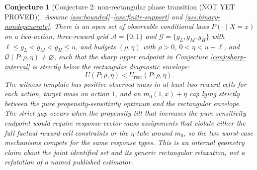 \documentclass[11pt]{article}
\theoremstyle{definition}
\theoremstyle{plain}
\newtheorem{conjecture}{Conjecture}
\theoremstyle{remark}
\begin{document}
\begin{conjecture}[Conjecture 2: non-rectangular phase transition (NOT YET PROVED)]\label{conj:nonrect}
Assume \ref{ass:bounded}--\ref{ass:finite-support} and \ref{ass:binary-nondegenerate}. There is an open set of observable conditional laws $P(\cdot\mid X=x)$ on a two-action, three-reward grid $\mathcal A=\{0,1\}$ and $\mathcal G=\{g_L,g_M,g_H\}$ with $\ell\le g_L<g_M<g_H\le u$, and budgets $(\rho,\eta)$ with $\rho>0$, $0<\eta<u-\ell$, and $\mathcal Q(P;\rho,\eta)\ne\varnothing$, such that the sharp upper endpoint in Conjecture \ref{conj:sharp-interval} is strictly below the rectangular diagnostic envelope:
\[
  U(P;\rho,\eta) < U_{\mathrm{rect}}(P;\rho,\eta).
\]
The witness template has positive observed mass in at least two reward cells for each action, target mass on action $1$, and an $m_0(1,x)+\eta$ cap lying strictly between the pure propensity-sensitivity optimum and the rectangular envelope. The strict gap occurs when the propensity tilt that increases the pure sensitivity endpoint would require response-vector mass assignments that violate either the full factual reward-cell constraints or the $\eta$-tube around $m_0$, so the two worst-case mechanisms compete for the same response types. This is an internal geometry claim about the joint identified set and its generic rectangular relaxation, not a refutation of a named published estimator.
\end{conjecture}
\end{document}
